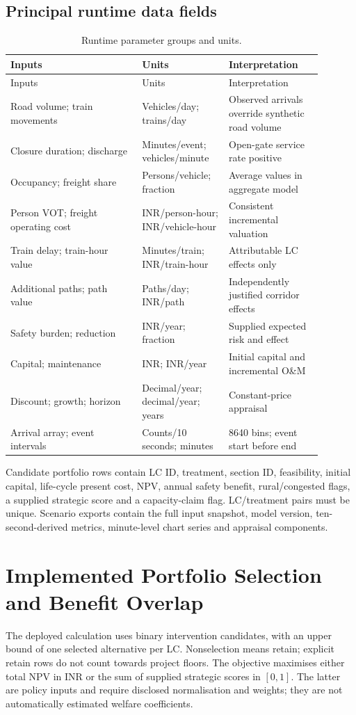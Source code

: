 \documentclass[11pt,a4paper]{article}
\begin{document}
\subsection{Principal runtime data fields}
\begin{longtable}{p{0.38\linewidth}p{0.24\linewidth}p{0.27\linewidth}}
\caption{Runtime parameter groups and units.}\\\toprule
Inputs & Units & Interpretation\\\midrule\endfirsthead
\toprule Inputs & Units & Interpretation\\\midrule\endhead
Road volume; train movements & Vehicles/day; trains/day & Observed arrivals override synthetic road volume\\
Closure duration; discharge & Minutes/event; vehicles/minute & Open-gate service rate positive\\
Occupancy; freight share & Persons/vehicle; fraction & Average values in aggregate model\\
Person VOT; freight operating cost & INR/person-hour; INR/vehicle-hour & Consistent incremental valuation\\
Train delay; train-hour value & Minutes/train; INR/train-hour & Attributable LC effects only\\
Additional paths; path value & Paths/day; INR/path & Independently justified corridor effects\\
Safety burden; reduction & INR/year; fraction & Supplied expected risk and effect\\
Capital; maintenance & INR; INR/year & Initial capital and incremental O\&M\\
Discount; growth; horizon & Decimal/year; decimal/year; years & Constant-price appraisal\\
Arrival array; event intervals & Counts/10 seconds; minutes & 8640 bins; event start before end\\\bottomrule
\end{longtable}
Candidate portfolio rows contain LC ID, treatment, section ID, feasibility, initial capital, life-cycle present cost, NPV, annual safety benefit, rural/congested flags, a supplied strategic score and a capacity-claim flag. LC/treatment pairs must be unique. Scenario exports contain the full input snapshot, model version, ten-second-derived metrics, minute-level chart series and appraisal components.

\section{Implemented Portfolio Selection and Benefit Overlap}
The deployed calculation uses binary intervention candidates, with an upper bound of one selected alternative per LC. Nonselection means retain; explicit retain rows do not count towards project floors. The objective maximises either total NPV in INR or the sum of supplied strategic scores in $[0,1]$. The latter are policy inputs and require disclosed normalisation and weights; they are not automatically estimated welfare coefficients.
\end{document}

